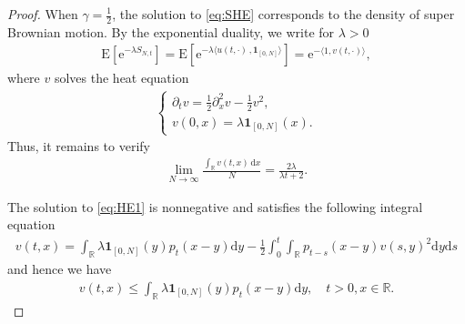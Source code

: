 \documentclass[10pt,a4paper]{amsart}
\newcommand{\E}{\mathrm{E}}
\newcommand{\R}{{\mathbb{R}}}
\newcommand{\e}{\mathrm{e}}
\renewcommand{\d}{\mathrm{d}}
\begin{document}
\begin{proof}
           When $\gamma=\frac12$, the solution to \eqref{eq:SHE} corresponds to the density of super Brownian motion. By 
           the exponential duality, we write for $\lambda>0$
\begin{align*}
\E\left[\e^{-\lambda S_{N,t}}\right] =\E\left[\e^{-\lambda \langle u(t, \cdot)\,, 
\bm{1}_{[0, N]}\rangle}\right] = \e^{-\langle 1, v(t, \cdot)\rangle},
\end{align*}
where $v$ solves the heat equation
\begin{align}\label{eq:HE1}
\begin{cases}
\partial_tv= \frac12 \partial_x^2 v -\frac12 v^2,\\
v(0, x)= \lambda \bm{1}_{[0, N]}(x).
\end{cases}
\end{align}
Thus, it remains to verify 
\begin{align}\label{eq:LDPlim}
\lim_{N\to\infty} \frac{\int_\R v(t,x)\, \d x}{N} = \frac{2\lambda}{\lambda t+2}.
\end{align}


The solution to \eqref{eq:HE1} is nonnegative and satisfies the following integral equation
\begin{align*}
v(t,x)= \int_\R \lambda \bm{1}_{[0, N]}(y) p_t(x-y)\d y -\frac12 \int_0^t\int_\R p_{t-s}(x-y)v(s, y)^2\d y\d s
\end{align*}
and hence we have 
\begin{align}\label{eq:vbound}
v(t,x ) \leq  \int_\R \lambda \bm{1}_{[0, N]}(y) p_t(x-y)\d y, \quad t>0, x\in\R. 
\end{align}


\end{proof}
\end{document}
